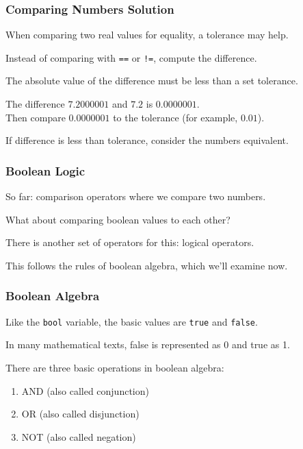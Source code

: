 \begin{frame}
\frametitle{Comparing Numbers Solution}

When comparing two real values for equality, a \alert{tolerance} may help.

Instead of comparing with \texttt{==} or \texttt{!=}, compute the difference.

The absolute value of the difference must be less than a set tolerance.

The difference $7.2000001$ and $7.2$ is $0.0000001$.\\
\quad Then compare $0.0000001$ to the tolerance (for example, $0.01$).

If difference is less than tolerance, consider the numbers equivalent.

\end{frame}

\begin{frame}
\frametitle{Boolean Logic}
So far: comparison operators where we compare two numbers.

What about comparing boolean values to each other?

There is another set of operators for this: \alert{logical operators}.

This follows the rules of \alert{boolean algebra}, which we'll examine now.

\end{frame}


\begin{frame}
\frametitle{Boolean Algebra}
Like the \texttt{bool} variable, the basic values are \texttt{true} and \texttt{false}.

In many mathematical texts, false is represented as 0 and true as 1.

There are three basic operations in boolean algebra:

\begin{enumerate}
	\item \alert{AND} (also called conjunction)
	\item \alert{OR} (also called disjunction)
	\item \alert{NOT} (also called negation)
\end{enumerate}

\end{frame}

